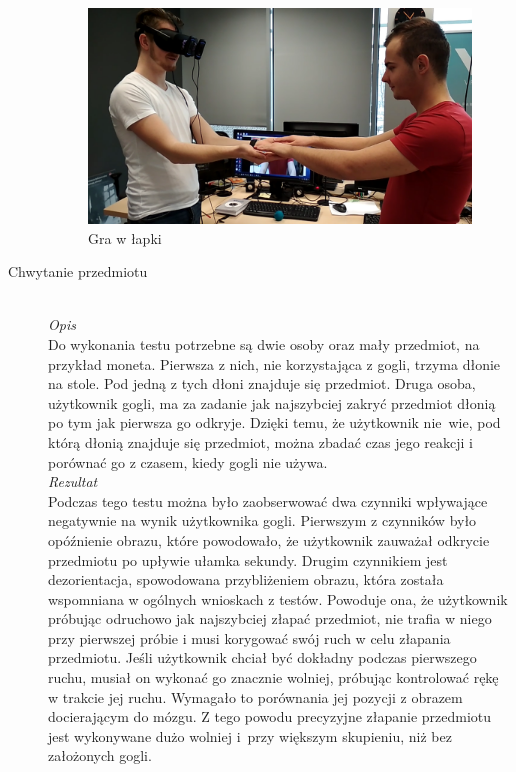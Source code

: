 \documentclass[a4paper,11pt,twoside]{report}
\theoremstyle{definition}
\begin{document}
\begin{description}
\begin{figure}[H]
\centering
\includegraphics[scale=0.25]{images/lapkiTest}
\caption[LapkiTest]{Gra w łapki}
\end{figure}


\item[Chwytanie przedmiotu] \hfill \\
\textit{Opis} \\
Do wykonania testu potrzebne są dwie osoby oraz mały przedmiot, na przykład moneta. Pierwsza z nich, nie korzystająca z gogli, trzyma dłonie na stole. Pod jedną z tych dłoni znajduje się przedmiot. Druga osoba, użytkownik gogli, ma za zadanie jak najszybciej zakryć przedmiot dłonią po tym jak pierwsza go odkryje. Dzięki temu, że użytkownik nie~wie, pod którą dłonią znajduje się przedmiot, można zbadać czas jego reakcji i porównać go z czasem, kiedy gogli nie używa. \\

\textit{Rezultat} \\
Podczas tego testu można było zaobserwować dwa czynniki wpływające negatywnie na wynik użytkownika gogli. Pierwszym z czynników było opóźnienie obrazu, które powodowało, że użytkownik zauważał odkrycie przedmiotu po upływie ułamka sekundy. Drugim czynnikiem jest dezorientacja, spowodowana przybliżeniem obrazu, która została wspomniana w ogólnych wnioskach z testów. Powoduje ona, że użytkownik próbując odruchowo jak najszybciej złapać przedmiot, nie trafia w niego przy pierwszej próbie i musi korygować swój ruch w celu złapania przedmiotu. Jeśli użytkownik chciał być dokładny podczas pierwszego ruchu, musiał on wykonać go znacznie wolniej, próbując kontrolować rękę w trakcie jej ruchu. Wymagało to porównania jej pozycji z obrazem docierającym do mózgu. Z tego powodu precyzyjne złapanie przedmiotu jest wykonywane dużo wolniej i~przy większym skupieniu, niż bez założonych gogli.


\end{description}
\end{document}
